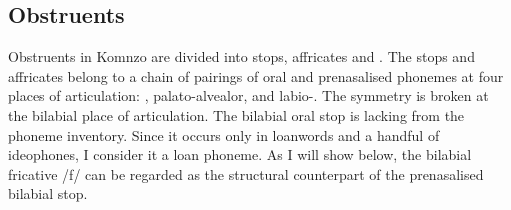 \begin{table}
\caption[Consonant phoneme inventory]{Consonant phoneme inventory}
\label{consinv}
\end{table} %

\subsection{Obstruents} \label{obstruents}

Obstruents in Komnzo are divided into stops, affricates and . The stops and affricates belong to a chain of pairings of oral and prenasalised phonemes at four places of articulation: , palato-alvealor,  and labio-. The symmetry is broken at the bilabial place of articulation. The bilabial oral stop is lacking from the phoneme inventory. Since it occurs only in  loanwords and a handful of ideophones, I consider it a loan phoneme. As I will show below, the bilabial fricative /f/ can be regarded as the structural counterpart of the prenasalised bilabial stop.%

